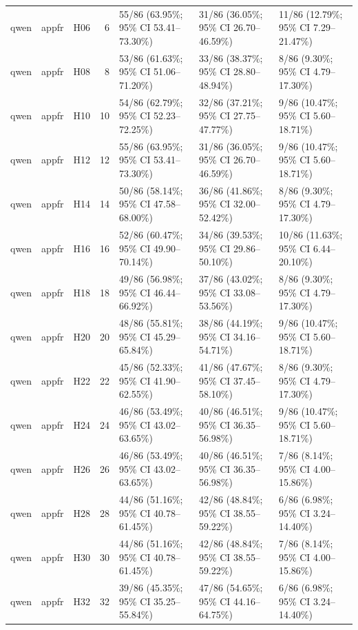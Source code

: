 \begin{longtable}{lllrlll}
qwen & appfr & H06 & 6 & 55/86 (63.95\%; 95\% CI 53.41–73.30\%) & 31/86 (36.05\%; 95\% CI 26.70–46.59\%) & 11/86 (12.79\%; 95\% CI 7.29–21.47\%) \\
qwen & appfr & H08 & 8 & 53/86 (61.63\%; 95\% CI 51.06–71.20\%) & 33/86 (38.37\%; 95\% CI 28.80–48.94\%) & 8/86 (9.30\%; 95\% CI 4.79–17.30\%) \\
qwen & appfr & H10 & 10 & 54/86 (62.79\%; 95\% CI 52.23–72.25\%) & 32/86 (37.21\%; 95\% CI 27.75–47.77\%) & 9/86 (10.47\%; 95\% CI 5.60–18.71\%) \\
qwen & appfr & H12 & 12 & 55/86 (63.95\%; 95\% CI 53.41–73.30\%) & 31/86 (36.05\%; 95\% CI 26.70–46.59\%) & 9/86 (10.47\%; 95\% CI 5.60–18.71\%) \\
qwen & appfr & H14 & 14 & 50/86 (58.14\%; 95\% CI 47.58–68.00\%) & 36/86 (41.86\%; 95\% CI 32.00–52.42\%) & 8/86 (9.30\%; 95\% CI 4.79–17.30\%) \\
qwen & appfr & H16 & 16 & 52/86 (60.47\%; 95\% CI 49.90–70.14\%) & 34/86 (39.53\%; 95\% CI 29.86–50.10\%) & 10/86 (11.63\%; 95\% CI 6.44–20.10\%) \\
qwen & appfr & H18 & 18 & 49/86 (56.98\%; 95\% CI 46.44–66.92\%) & 37/86 (43.02\%; 95\% CI 33.08–53.56\%) & 8/86 (9.30\%; 95\% CI 4.79–17.30\%) \\
qwen & appfr & H20 & 20 & 48/86 (55.81\%; 95\% CI 45.29–65.84\%) & 38/86 (44.19\%; 95\% CI 34.16–54.71\%) & 9/86 (10.47\%; 95\% CI 5.60–18.71\%) \\
qwen & appfr & H22 & 22 & 45/86 (52.33\%; 95\% CI 41.90–62.55\%) & 41/86 (47.67\%; 95\% CI 37.45–58.10\%) & 8/86 (9.30\%; 95\% CI 4.79–17.30\%) \\
qwen & appfr & H24 & 24 & 46/86 (53.49\%; 95\% CI 43.02–63.65\%) & 40/86 (46.51\%; 95\% CI 36.35–56.98\%) & 9/86 (10.47\%; 95\% CI 5.60–18.71\%) \\
qwen & appfr & H26 & 26 & 46/86 (53.49\%; 95\% CI 43.02–63.65\%) & 40/86 (46.51\%; 95\% CI 36.35–56.98\%) & 7/86 (8.14\%; 95\% CI 4.00–15.86\%) \\
qwen & appfr & H28 & 28 & 44/86 (51.16\%; 95\% CI 40.78–61.45\%) & 42/86 (48.84\%; 95\% CI 38.55–59.22\%) & 6/86 (6.98\%; 95\% CI 3.24–14.40\%) \\
qwen & appfr & H30 & 30 & 44/86 (51.16\%; 95\% CI 40.78–61.45\%) & 42/86 (48.84\%; 95\% CI 38.55–59.22\%) & 7/86 (8.14\%; 95\% CI 4.00–15.86\%) \\
qwen & appfr & H32 & 32 & 39/86 (45.35\%; 95\% CI 35.25–55.84\%) & 47/86 (54.65\%; 95\% CI 44.16–64.75\%) & 6/86 (6.98\%; 95\% CI 3.24–14.40\%) \\

\end{longtable}
